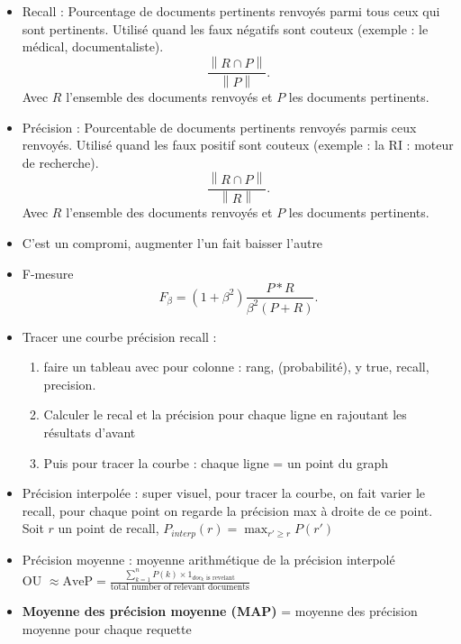 \documentclass{article}
\theoremstyle{plain}%
\theoremstyle{definition}
\theoremstyle{remark}
\begin{document}
\begin{itemize}
    \item Recall : Pourcentage de documents pertinents renvoyés parmi tous ceux qui sont pertinents. Utilisé quand les faux négatifs sont couteux (exemple : le médical, documentaliste).
    \[
        \frac{\left\| R \cap P \right\| }{\left\| P \right\| }
    .\]
    Avec $ R $ l'ensemble des documents renvoyés et $ P $ les documents pertinents. 

    \item Précision : Pourcentable de documents pertinents renvoyés parmis ceux renvoyés. Utilisé quand les faux positif sont couteux (exemple : la RI : moteur de recherche).
    \[
        \frac{\left\| R \cap P \right\| }{\left\| R \right\| }
    .\]
    Avec $ R $ l'ensemble des documents renvoyés et $ P $ les documents pertinents.

    \item C'est un compromi, augmenter l'un fait baisser l'autre
    \item F-mesure 
    \[
        F_\beta = (1 + \beta ^2) \frac{P * R}{\beta ^2 (P+R)}
    .\]

    \item Tracer une courbe précision recall : \begin{enumerate}
        \item faire un tableau avec pour colonne : rang, (probabilité), y true, recall, precision.
        \item Calculer le recal et la précision pour chaque ligne en rajoutant les résultats d'avant
        \item Puis pour tracer la courbe : chaque ligne = un point du graph
    \end{enumerate}
    
    \item Précision interpolée : super visuel, pour tracer la courbe, on fait varier le recall, pour chaque point on regarde la précision max à droite de ce point. Soit $ r $  un point de recall, $ P_{interp}(r) = \max _{r' \geq r} P(r') $ 
    
    \item Précision moyenne : moyenne arithmétique de la précision interpolé \\
    OU $ \approx \text{AveP} = \frac{\sum_{k=1}^n P(k) \times {1}_{doc_k \text{ is revelant}}} {\text{total number of relevant documents}}$ 
    \item \textbf{Moyenne des précision moyenne (MAP)} = moyenne des précision moyenne pour chaque requette
    
\end{itemize}
\end{document}
